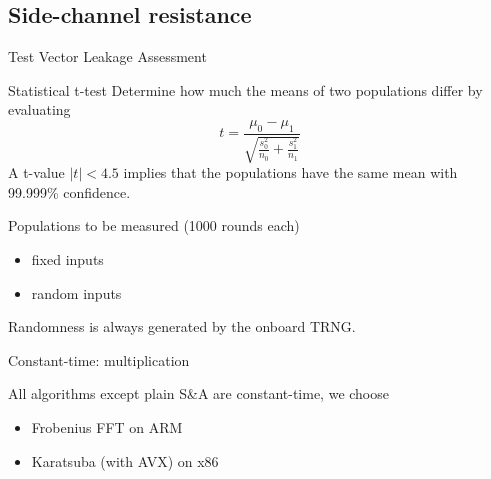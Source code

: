 \subsection{Side-channel resistance}

\begin{frame}{Test Vector Leakage Assessment}
    \begin{block}{Statistical t-test}
       Determine how much the means of two populations differ by evaluating
       \begin{equation*}
            t = \frac{\mu_0 - \mu_1}{\sqrt{\frac{s_0^2}{n_0} + \frac{s_1^2}{n_1}}}
       \end{equation*}
        A t-value $|t| < 4.5$ implies that the populations have the same mean with 99.999\% confidence. 
    \end{block}
    \begin{block}{}
        Populations to be measured (1000 rounds each)
        \begin{itemize}
            \item fixed inputs 
            \item random inputs 
        \end{itemize}
        Randomness is always generated by the onboard TRNG.
    \end{block}
\end{frame} 

\begin{frame}{Constant-time: multiplication}
    \begin{block}{}
        
    \end{block}
    \begin{block}{}
        All algorithms except plain S\&A are constant-time, we choose
        \begin{itemize}
            \item Frobenius FFT on ARM
            \item Karatsuba (with AVX) on x86
        \end{itemize}
    \end{block}
\end{frame}

